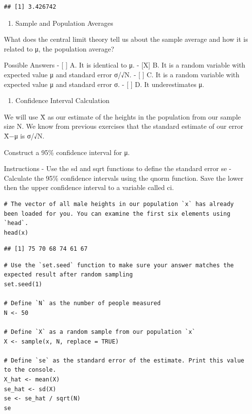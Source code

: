 \documentclass[
]{article}
\providecommand{\tightlist}{%
  \setlength{\itemsep}{0pt}\setlength{\parskip}{0pt}}
\begin{document}
\begin{verbatim}
## [1] 3.426742
\end{verbatim}

\begin{enumerate}
\def\labelenumi{\arabic{enumi}.}
\setcounter{enumi}{2}
\tightlist
\item
  Sample and Population Averages
\end{enumerate}

What does the central limit theory tell us about the sample average and
how it is related to μ, the population average?

Possible Answers - {[} {]} A. It is identical to μ. - {[}X{]} B. It is a
random variable with expected value μ and standard error σ/√N. - {[} {]}
C. It is a random variable with expected value μ and standard error σ. -
{[} {]} D. It underestimates μ.

\begin{enumerate}
\def\labelenumi{\arabic{enumi}.}
\setcounter{enumi}{3}
\tightlist
\item
  Confidence Interval Calculation
\end{enumerate}

We will use X̄ as our estimate of the heights in the population from our
sample size N. We know from previous exercises that the standard
estimate of our error X̄−μ is σ/√N.

Construct a 95\% confidence interval for μ.

Instructions - Use the sd and sqrt functions to define the standard
error se - Calculate the 95\% confidence intervals using the qnorm
function. Save the lower then the upper confidence interval to a
variable called ci.

\begin{verbatim}
# The vector of all male heights in our population `x` has already been loaded for you. You can examine the first six elements using `head`.
head(x)
\end{verbatim}

\begin{verbatim}
## [1] 75 70 68 74 61 67
\end{verbatim}

\begin{verbatim}
# Use the `set.seed` function to make sure your answer matches the expected result after random sampling
set.seed(1)

# Define `N` as the number of people measured
N <- 50

# Define `X` as a random sample from our population `x`
X <- sample(x, N, replace = TRUE)

# Define `se` as the standard error of the estimate. Print this value to the console.
X_hat <- mean(X)
se_hat <- sd(X)
se <- se_hat / sqrt(N)
se
\end{verbatim}
\end{document}
